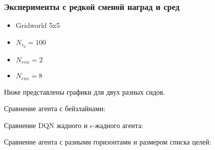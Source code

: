 \documentclass[a4paper]{article}
\begin{document}


\subsubsection{Эксперименты с редкой сменой наград и сред}

\begin{itemize}
  \item Gridworld 5x5
  \item $N_{s_0} = 100$
  \item $N_{rew} = 2$
  \item $N_{env} = 8$
\end{itemize}

Ниже представлены графики для двух разных сидов.

Сравнение агента с бейзлайнами:


Сравнение DQN жадного и $\epsilon$-жадного агента:


Сравнение агента с разными горизонтами и размером списка целей:

  
\end{document}
